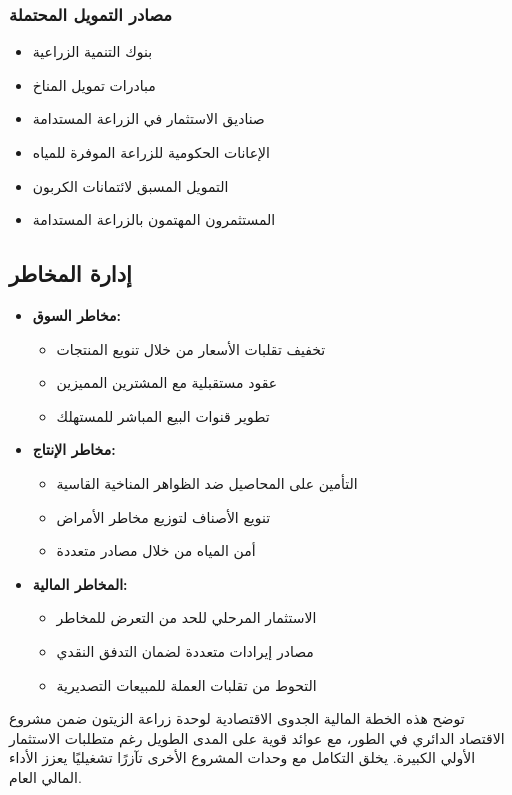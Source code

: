 \subsubsection{مصادر التمويل المحتملة}
\begin{itemize}
    \item بنوك التنمية الزراعية
    \item مبادرات تمويل المناخ
    \item صناديق الاستثمار في الزراعة المستدامة
    \item الإعانات الحكومية للزراعة الموفرة للمياه
    \item التمويل المسبق لائتمانات الكربون
    \item المستثمرون المهتمون بالزراعة المستدامة
\end{itemize}

\subsection{إدارة المخاطر}
\begin{itemize}
    \item \textbf{مخاطر السوق:}
    \begin{itemize}
        \item تخفيف تقلبات الأسعار من خلال تنويع المنتجات
        \item عقود مستقبلية مع المشترين المميزين
        \item تطوير قنوات البيع المباشر للمستهلك
    \end{itemize}
    
    \item \textbf{مخاطر الإنتاج:}
    \begin{itemize}
        \item التأمين على المحاصيل ضد الظواهر المناخية القاسية
        \item تنويع الأصناف لتوزيع مخاطر الأمراض
        \item أمن المياه من خلال مصادر متعددة
    \end{itemize}
    
    \item \textbf{المخاطر المالية:}
    \begin{itemize}
        \item الاستثمار المرحلي للحد من التعرض للمخاطر
        \item مصادر إيرادات متعددة لضمان التدفق النقدي
        \item التحوط من تقلبات العملة للمبيعات التصديرية
    \end{itemize}
\end{itemize}

توضح هذه الخطة المالية الجدوى الاقتصادية لوحدة زراعة الزيتون ضمن مشروع الاقتصاد الدائري في الطور، مع عوائد قوية على المدى الطويل رغم متطلبات الاستثمار الأولي الكبيرة. يخلق التكامل مع وحدات المشروع الأخرى تآزرًا تشغيليًا يعزز الأداء المالي العام.
